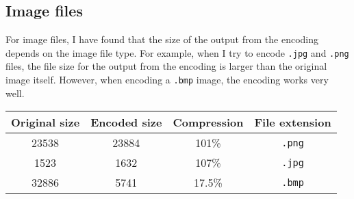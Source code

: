 \documentclass{article}
\newcommand{\tablerow}[4]{ #1 & #2 & #3 & #4\\}
\begin{document}
\subsection{Image files}
For image files, I have found that the size of the output from the encoding depends on the image file type. For example, when I try to encode \texttt{.jpg} and \texttt{.png} files, the file size for the output from the encoding is larger than the original image itself. However, when encoding a \texttt{.bmp} image, the encoding works very well.

\begin{center}
\begin{tabular}{ |c|c|c|c| }
\hline
Original size & Encoded size & Compression & File extension \\
\hline
\tablerow{23538}{23884}{101\%}{\texttt{.png}}
\tablerow{1523}{1632}{107\%}{\texttt{.jpg}}
\tablerow{32886}{5741}{17.5\%}{\texttt{.bmp}}
\hline
\end{tabular}
\end{center}
\end{document}
